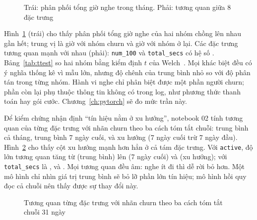 \begin{figure}[H]
  \centering
  \begin{minipage}{0.47\textwidth}\centering{}\end{minipage}\hfill
  \begin{minipage}{0.5\textwidth}\centering{}\end{minipage}
  \caption{Trái: phân phối tổng giờ nghe trong tháng. Phải: tương quan giữa 8 đặc trưng}
  \label{fig:kkhist}
\end{figure}

Hình~\ref{fig:kkhist} (trái) cho thấy phân phối tổng giờ nghe của hai nhóm chồng lên nhau gần hết; trung vị là
 giờ với nhóm churn và  giờ với nhóm ở lại. Các đặc trưng tương quan
mạnh với nhau (phải): \texttt{num\_100} và \texttt{total\_secs} có hệ số . Bảng~\ref{tab:ttest}
so hai nhóm bằng kiểm định $t$ của Welch~\cite{welch1947}. Mọi khác biệt đều có ý nghĩa thống kê vì mẫu lớn, nhưng
độ chênh của trung bình nhỏ so với độ phân tán trong từng nhóm. Hành vi nghe chỉ phân biệt được một phần người churn;
phần còn lại phụ thuộc thông tin không có trong log, như phương thức thanh toán hay gói cước. Chương~\ref{ch:pytorch}
sẽ đo mức trần này.

\begin{table}[H]
  \centering\small
  \caption{Kiểm định $t$ Welch giữa nhóm ở lại và nhóm churn, trung bình 31 ngày của từng người}
  \label{tab:ttest}
  
\end{table}

Để kiểm chứng nhận định ``tín hiệu nằm ở xu hướng'', notebook 02 tính tương quan của từng đặc trưng với nhãn churn
theo ba cách tóm tắt chuỗi: trung bình cả tháng, trung bình 7 ngày cuối, và xu hướng (7 ngày cuối trừ 7 ngày đầu).
Hình~\ref{fig:labelcorr} cho thấy cột xu hướng mạnh hơn hẳn ở cả tám đặc trưng. Với \texttt{active}, độ lớn tương quan tăng từ
 (trung bình) lên  (7 ngày cuối) và
 (xu hướng); với \texttt{total\_secs} là ,
 và . Mọi tương quan đều âm: nghe ít đi
thì dễ rời bỏ hơn. Một mô hình chỉ nhìn giá trị trung bình sẽ bỏ lỡ phần lớn tín hiệu; mô hình hồi quy đọc cả chuỗi
nên thấy được sự thay đổi này.

\begin{figure}[H]
  \centering
  \caption{Tương quan từng đặc trưng với nhãn churn theo ba cách tóm tắt chuỗi 31 ngày}
  \label{fig:labelcorr}
\end{figure}

